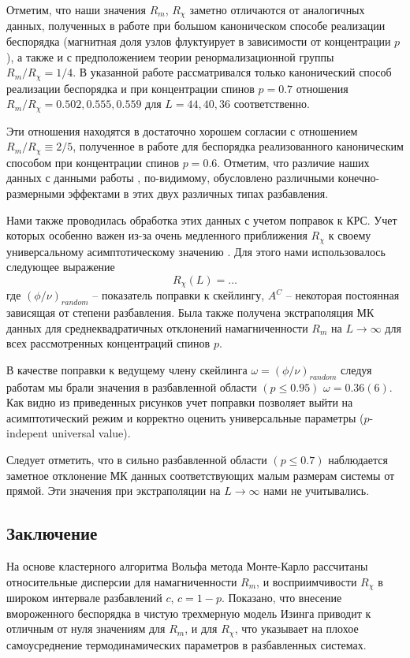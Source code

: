 Отметим, что наши значения $R_m$, $R_\chi$ заметно отличаются от аналогичных данных, полученных в работе \cite{ph2_4} при большом каноническом способе реализации беспорядка (магнитная доля узлов флуктуирует в зависимости от концентрации $p$), а также и с предположением теории ренормализационной группы  $R_m / R_\chi = 1/4$. В указанной работе рассматривался только канонический способ реализации беспорядка и при концентрации спинов $p=0.7$ отношения $R_m / R_\chi =0.502, 0.555, 0.559$ для $L=44, 40, 36$ соответственно.

Эти отношения находятся в достаточно хорошем согласии с отношением $R_m / R_\chi \equiv 2/5$, полученное в работе \cite{ph2_1} для беспорядка реализованного каноническим способом при концентрации спинов $p=0.6$. Отметим, что различие наших данных с данными работы \cite{ph2_4}, по-видимому, обусловлено различными конечно-размерными эффектами в этих двух различных типах разбавления.


Нами также проводилась обработка этих данных с учетом поправок к КРС. Учет которых особенно важен из-за очень медленного приближения $R_\chi$ к своему универсальному асимптотическому значению \cite{ph2_3}. Для этого нами использовалось следующее выражение
\begin{equation*}
  R_\chi(L) = \ldots
\end{equation*}
где $(\phi/\nu)_{random}$ – показатель поправки к скейлингу, $A^C$ – некоторая постоянная зависящая от степени разбавления. 
Была также получена экстраполяция МК данных для среднеквадратичных отклонений намагниченности $R_m$ на $L \rightarrow \infty$  для всех рассмотренных концентраций спинов $p$. 

В качестве поправки к ведущему члену скейлинга $\omega = (\phi/\nu)_{random}$  следуя работам \cite{ph2_8,ph2_9} мы брали значения в разбавленной области $(p\le0.95)$ $\omega=0.36(6)$.
Как видно из приведенных рисунков учет поправки позволяет выйти на асимптотический режим и корректно оценить универсальные параметры ($p$-indepent universal value). 

Следует отметить, что в сильно разбавленной области $(p\le0.7)$ наблюдается заметное отклонение МК данных соответствующих малым размерам системы от прямой. Эти значения при экстраполяции на $L \rightarrow \infty$    нами не учитывались.






\subsection{Заключение}


На основе кластерного алгоритма Вольфа метода Монте-Карло рассчитаны относительные дисперсии для намагниченности $R_m$, и восприимчивости $R_\chi$ в широком интервале разбавлений $c$, $c=1-p$. 
Показано, что внесение вмороженного беспорядка в чистую трехмерную модель Изинга приводит к отличным от нуля значениям для $R_m$, и для $R_\chi$, что указывает на плохое самоусреднение термодинамических параметров в разбавленных системах.


